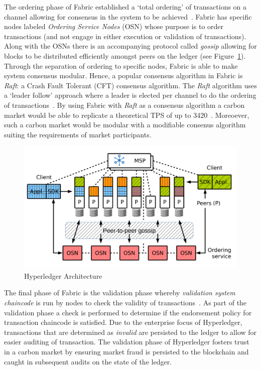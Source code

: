 The ordering phase of Fabric established a `total ordering' of transactions
on a channel allowing for consensus in the system to be achieved~\cite{And18}.
Fabric has specific nodes labeled \textit{Ordering Service Nodes} (OSN)
whose purpose is to order transactions (and not engage in either
execution or validation of transactions). Along with the OSNs there
is an accompanying protocol called \textit{gossip} allowing for blocks
to be distributed efficiently amongst peers on the ledger
(see Figure~\ref{fig:harch}). Through the separation of ordering to
specific nodes, Fabric is able to make system consensus modular.
Hence, a popular consensus algorithm in Fabric is \textit{Raft}: a Crash Fault
Tolerant (CFT) consensus algorithm. The \textit{Raft} algorithm uses
a `leader follow' approach where a leader is elected per channel to
do the ordering of transactions~\cite{raft}. By using Fabric with
\textit{Raft} as a consensus algorithm a carbon market would be able
to replicate a theoretical TPS of up to 3420~\cite{And18}. Moreoever,
such a carbon market would be modular with a modifiable consenus
algorithm suiting the requirements of market participants.

\begin{figure}[ht]
    \centering
    \includegraphics[scale=0.4]{photos/hyperarch.png}
    \caption{Hyperledger Architecture}
    \label{fig:harch}
\end{figure}

The final phase of Fabric is the validation phase whereby
\textit{validation system chaincode} is run by nodes to check the
validity of transactions~\cite{And18}. As part of the
validation phase a check is
performed to determine if the endorsement policy for transaction
chaincode is satisfied.
Due to the enterprise focus of Hyperledger, transactions that
are determined as \textit{invalid} are persisted to the ledger to allow
for easier auditing of transaction. The validation phase of Hyperledger
fosters trust in a carbon market by ensuring market fraud is persisted to the
blockchain and caught in subsequent audits on the state of the ledger.

